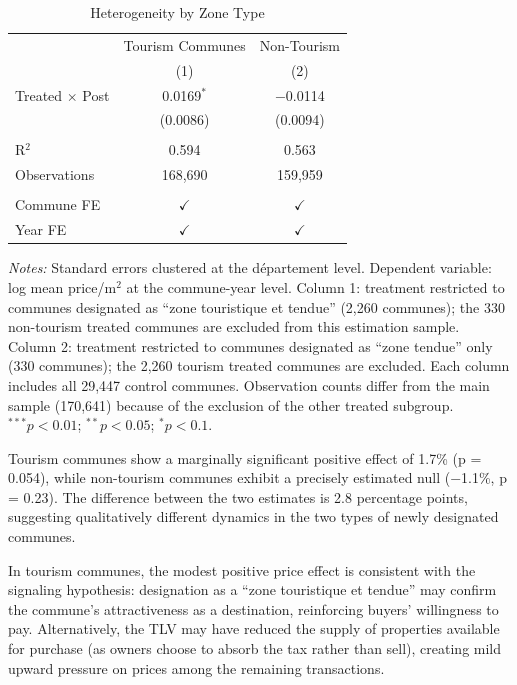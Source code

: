 \documentclass[12pt]{article}
\begin{document}
\begin{table}[htbp]
    \centering
    \caption{Heterogeneity by Zone Type}
    \label{tab:heterogeneity}
    \begin{threeparttable}
    \begin{tabular}{lcc}
    \toprule
    & Tourism Communes & Non-Tourism \\
    & (1) & (2) \\
    \midrule
    Treated $\times$ Post & 0.0169$^{*}$ & $-$0.0114 \\
    & (0.0086) & (0.0094) \\
    \\
    R$^2$ & 0.594 & 0.563 \\
    Observations & 168,690 & 159,959 \\
    \\
    Commune FE & $\checkmark$ & $\checkmark$ \\
    Year FE & $\checkmark$ & $\checkmark$ \\
    \bottomrule
    \end{tabular}
    \begin{tablenotes}[flushleft]\small
    \item \textit{Notes:} Standard errors clustered at the d\'epartement level. Dependent variable: log mean price/m$^2$ at the commune-year level. Column 1: treatment restricted to communes designated as ``zone touristique et tendue'' (2,260 communes); the 330 non-tourism treated communes are excluded from this estimation sample. Column 2: treatment restricted to communes designated as ``zone tendue'' only (330 communes); the 2,260 tourism treated communes are excluded. Each column includes all 29,447 control communes. Observation counts differ from the main sample (170,641) because of the exclusion of the other treated subgroup. $^{***}p<0.01$; $^{**}p<0.05$; $^{*}p<0.1$.
    \end{tablenotes}
    \end{threeparttable}
\end{table}

Tourism communes show a marginally significant positive effect of 1.7\% (p = 0.054), while non-tourism communes exhibit a precisely estimated null ($-$1.1\%, p = 0.23). The difference between the two estimates is 2.8 percentage points, suggesting qualitatively different dynamics in the two types of newly designated communes.

In tourism communes, the modest positive price effect is consistent with the signaling hypothesis: designation as a ``zone touristique et tendue'' may confirm the commune's attractiveness as a destination, reinforcing buyers' willingness to pay. Alternatively, the TLV may have reduced the supply of properties available for purchase (as owners choose to absorb the tax rather than sell), creating mild upward pressure on prices among the remaining transactions.
\end{document}
